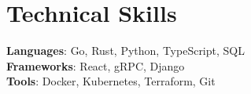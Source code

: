 \documentclass[letterpaper,11pt]{article}
\begin{document}
\section{Technical Skills}
 \begin{itemize}[leftmargin=0.15in, label={}]
    \small{\item{
     \textbf{Languages}{: Go, Rust, Python, TypeScript, SQL} \\
     \textbf{Frameworks}{: React, gRPC, Django} \\
     \textbf{Tools}{: Docker, Kubernetes, Terraform, Git}
    }}
 \end{itemize}
\end{document}
